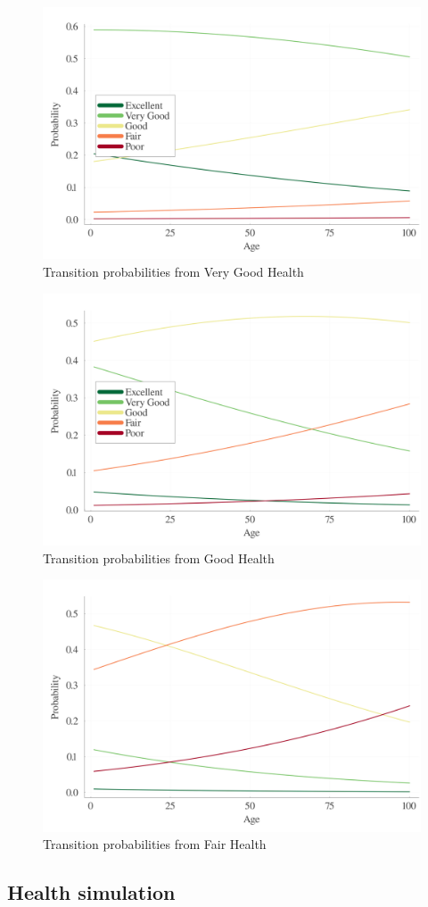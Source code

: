 \documentclass{article}
\begin{document}
\begin{figure}[H]\label{fig:health_transition_2}
    \begin{center}
        \includegraphics[width=0.4\linewidth]{output/health_transition_2.png}
        \caption{Transition probabilities from Very Good Health}    
    \end{center}
\end{figure}

\begin{figure}[H]\label{fig:health_transition_3}
    \begin{center}
        \includegraphics[width=0.4\linewidth]{output/health_transition_3.png}
        \caption{Transition probabilities from Good Health}  
    \end{center}  
\end{figure}

\begin{figure}[H]\label{fig:health_transition_4}
    \begin{center}
        \includegraphics[width=0.4\linewidth]{output/health_transition_4.png}
        \caption{Transition probabilities from Fair Health}    
    \end{center}
\end{figure}

\subsection{Health simulation}
\end{document}
